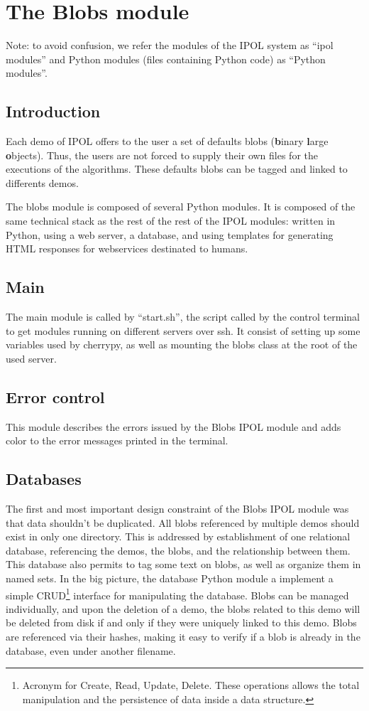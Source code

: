 \section{The Blobs module}

Note: to avoid confusion, we refer the modules of the IPOL system as ``ipol modules'' and Python modules (files containing Python code) as ``Python modules''.

\subsection{Introduction}
Each demo of IPOL offers to the user a set of defaults blobs (\textbf{b}inary \textbf{l}arge \textbf{o}bjects). Thus, the users are not forced to supply their own files for the executions of the algorithms. These defaults blobs can be tagged and linked to differents demos.

The blobs module is composed of several Python modules. It is composed of the same technical stack as the rest of the rest of the IPOL modules: written in Python, using a web server, a database, and using templates for generating HTML responses for webservices destinated to humans.

\subsection{Main}
The main module is called by ``start.sh'', the script called by the control terminal to get modules running on different servers over ssh. It consist of setting up some variables used by cherrypy, as well as mounting the blobs class at the root of the used server.

\subsection{Error control}
This module describes the errors issued by the Blobs IPOL module and adds color to the error messages printed in the terminal.

\subsection{Databases}
The first and most important design constraint of the Blobs IPOL module was that data shouldn't be duplicated. All blobs referenced by multiple demos should exist in only one directory. This is addressed by establishment of one relational database, referencing the demos, the blobs, and the relationship between them. This database also permits to tag some text on blobs, as well as organize them in named sets. In the big picture, the database Python module a implement a simple CRUD\footnote{Acronym for Create, Read, Update, Delete. These operations allows the total manipulation and the persistence of data inside a data structure.} interface for manipulating the database. Blobs can be managed individually, and upon the deletion of a demo, the blobs related to this demo will be deleted from disk if and only if they were uniquely linked to this demo. Blobs are referenced via their hashes, making it easy to verify if a blob is already in the database, even under another filename. \\


